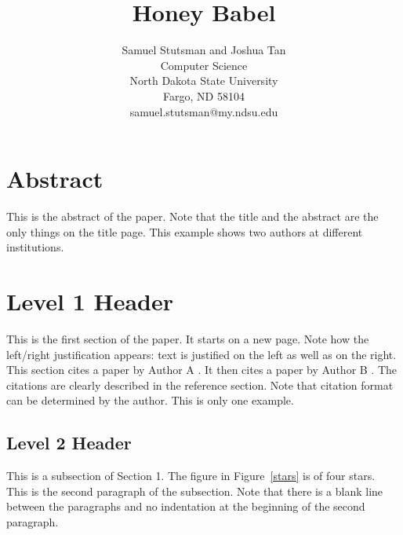 \documentclass[12pt]{article}
\begin{document}
\pagestyle{plain}

\title{Honey Babel}

\author{
Samuel Stutsman and Joshua Tan\\
Computer Science\\
North Dakota State University\\
Fargo, ND 58104\\
samuel.stutsman@my.ndsu.edu
}
\date{} 

\maketitle
\thispagestyle{empty}

\section*{\centering Abstract}

This is the abstract of the paper.  Note that the title and the abstract are the only things on the title page.  This example shows two authors at different institutions.

\newpage
\setcounter{page}{1}

\section{Level 1 Header}

This is the first section of the paper.  It starts on a new page.  Note how the left/right justification appears: text is justified on the left as well as on the right.  This section cites a paper by Author A \cite{Juels:2013:HMP:2508859.2516671}.  It then cites a paper by Author B \cite{Mazurek:2013:MPG:2508859.2516726}.  The citations are clearly described in the reference section.  Note that citation format can be determined by the author.  This is only one example.

\subsection{Level 2 Header}

This is a subsection of Section 1.   The figure in Figure~\ref{stars} is of four stars.\\

This is the second paragraph of the subsection.  Note that there is a blank line between the paragraphs and
no indentation at the beginning of the second paragraph. 
 
\end{document}
